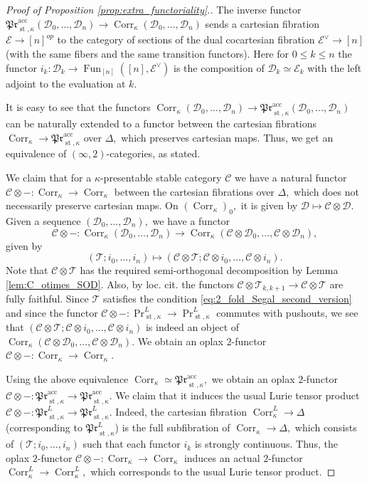 \documentclass[11pt,leqno]{amsart}
\numberwithin{equation}{section}
\newcommand{\Corr}{\operatorname{Corr}}
\newcommand{\acc}{\operatorname{acc}}
\newcommand{\st}{\operatorname{st}}
\newcommand{\cD}{{\mathcal D}}
\newcommand{\cC}{{\mathcal C}}
\newcommand{\cE}{{\mathcal E}}
\newcommand{\cT}{{\mathcal T}}
\newcommand{\Fun}{\operatorname{Fun}}
\newcommand{\mPr}{\mathfrak{Pr}}
\begin{document}
\begin{proof}[Proof of Proposition \ref{prop:extra_functoriality}.]
The inverse functor $\mPr^{\acc}_{\st,\kappa}(\cD_0,\dots,\cD_n)\to\Corr_{\kappa}(\cD_0,\dots,\cD_n)$ sends a cartesian fibration $\cE\to [n]^{op}$ to the category of sections of the dual cocartesian fibration $\cE^{\vee}\to [n]$ (with the same fibers and the same transition functors). Here for $0\leq k\leq n$ the functor $i_k:\cD_k\to \Fun_{[n]}([n],\cE^{\vee})$ is the composition of $\cD_k\simeq\cE_k$ with the left adjoint to the evaluation at $k.$ 

It is easy to see that the functors $\Corr_{\kappa}(\cD_0,\dots,\cD_n)\to \mPr^{\acc}_{\st,\kappa}(\cD_0,\dots,\cD_n)$ can be naturally extended to a functor between the cartesian fibrations $\Corr_{\kappa}\to\mPr^{\acc}_{\st,\kappa}$ over $\Delta,$ which preserves cartesian maps. Thus, we get an equivalence of $(\infty,2)$-categories, as stated.

We claim that for a $\kappa$-presentable stable category $\cC$ we have a natural functor $\cC\otimes-:\Corr_{\kappa}\to\Corr_{\kappa}$ between the cartesian fibrations over $\Delta,$ which does not necessarily preserve cartesian maps. On $(\Corr_{\kappa})_0,$ it is given by $\cD\mapsto\cC\otimes\cD.$ Given a sequence $(\cD_0,\dots,\cD_n),$ we have a functor $$\cC\otimes-:\Corr_{\kappa}(\cD_0,\dots,\cD_n)\to \Corr_{\kappa}(\cC\otimes\cD_0,\dots,\cC\otimes\cD_n),$$ 
given by $$(\cT;i_0,\dots,i_n)\mapsto (\cC\otimes\cT;\cC\otimes i_0,\dots,\cC\otimes i_n).$$
Note that $\cC\otimes\cT$ has the required semi-orthogonal decomposition by Lemma \ref{lem:C_otimes_SOD}. Also, by loc. cit. the functors $\cC\otimes\cT_{k,k+1}\to\cC\otimes\cT$ are fully faithful. Since $\cT$ satisfies the condition \eqref{eq:2_fold_Segal_second_version} and since the functor $\cC\otimes-:\Pr^L_{\st,\kappa}\to\Pr^L_{\st,\kappa}$ commutes with pushouts, we see that $(\cC\otimes\cT;\cC\otimes i_0,\dots,\cC\otimes i_n)$ is indeed an object of $\Corr_{\kappa}(\cC\otimes\cD_0,\dots,\cC\otimes\cD_n).$ We obtain an oplax $2$-functor $\cC\otimes-:\Corr_{\kappa}\to\Corr_{\kappa}.$

Using the above equivalence $\Corr_{\kappa}\simeq\mPr^{\acc}_{\st,\kappa},$ we obtain an oplax $2$-functor $\cC\otimes-:\mPr^{\acc}_{\st,\kappa}\to\mPr^{\acc}_{\st,\kappa}.$ We claim that it induces the usual Lurie tensor product $\cC\otimes-:\mPr^L_{\st,\kappa}\to\mPr^L_{\st,\kappa}.$ Indeed, the cartesian fibration $\Corr^L_{\kappa}\to\Delta$ (corresponding to $\mPr^L_{\st,\kappa}$) is the full subfibration of $\Corr_{\kappa}\to\Delta,$ which consists of $(\cT;i_0,\dots,i_n)$ such that each functor $i_k$ is strongly continuous. Thus, the oplax $2$-functor $\cC\otimes-:\Corr_{\kappa}\to\Corr_{\kappa}$ induces an actual $2$-functor $\Corr^L_{\kappa}\to\Corr^L_{\kappa},$ which corresponds to the usual Lurie tensor product. 


\end{proof}
\end{document}
